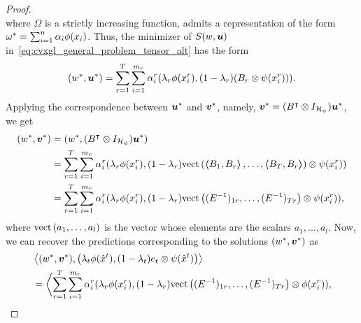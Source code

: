 \begin{proof}
\begin{equation}
    \end{equation}
    where $\Omega$ is a strictly increasing function,
    admits a representation of the form ${\omega}^* = \sum_{i=1}^n \alpha_i \phi(x_i)$.
    Thus, the minimizer of $S(w, \bm{u})$ in~\eqref{eq:cvxgl_general_problem_tensor_alt} has the form
    \begin{equation}
        \label{eq:repr_th_convexgl_u}
        (w^*, \fv{u}^*) = \sum_{r=1}^\ntasks \sum_{i=1}^{\npertask_r} \alpha_i^r (\lambda_r \phi(x_i^r), (1-\lambda_r) (B_r \otimes \psi(x_i^r))) .
    \end{equation}
    Applying the correspondence between $\bm{u}^*$ and $\bm{v}^*$, namely, ${\bm{v}}^* = (B^\intercal \otimes I_{\mathcal{H}_\psi}) {\bm{u}}^*$, we get
    \begin{equation}
        \label{eq:repr_th_convexgl_v}
        \begin{aligned}
            (w^*, \fv{v}^*)
             & = (w^*, (B^\intercal \otimes I_{\rkhs_\psi}) \fv{u}^*)                                                                                                                       \\
             & =  \sum_{r=1}^\ntasks \sum_{i=1}^{\npertask_r} \alpha_i^r (\lambda_r \phi(x_i^r), (1 - \lambda_r)\vect{\dotp{B_1}{B_r}, \ldots, \dotp{B_\ntasks}{B_r}} \otimes \psi(x_i^r)) \\
             & =  \sum_{r=1}^\ntasks \sum_{i=1}^{\npertask_r} \alpha_i^r (\lambda_r \phi(x_i^r), (1 - \lambda_r)\vect{(E^{-1})_{1r}, \ldots, (E^{-1})_{\ntasks r}} \otimes \psi(x_i^r)),
        \end{aligned}
    \end{equation}
    where $\bm{\text{vect}}\left(a_1, \ldots, a_l\right)$ is the vector whose elements are the scalars $a_1, \ldots, a_l$.
    Now, we can recover the predictions corresponding to the solutions $(w^*, \bm{v}^*)$ as
    \begin{equation}
        \nonumber
        \begin{aligned}
             & \dotp{(w^*, \fv{v}^*)}{\left(\lambda_t \phi(\hat{x}^t), (1 - \lambda_t) e_t \otimes \psi(\hat{x}^t) \right)}                                                                                           \\
             & = \biggl\langle \sum_{r=1}^\ntasks \sum_{i=1}^{\npertask_r} \alpha_i^r (\lambda_r \phi(x_i^r), (1 - \lambda_r) \vect{(E^{-1})_{1r}, \ldots, (E^{-1})_{\ntasks r}} \otimes \phi(x_i^r) ), \\

\end{aligned}
\end{equation}
\end{proof}
